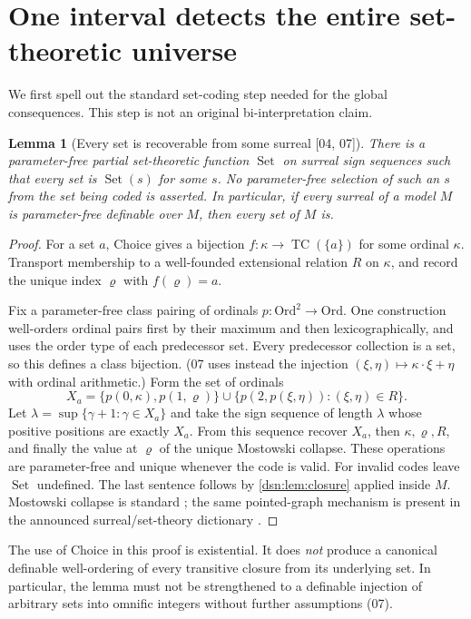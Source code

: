 \documentclass[11pt,a4paper]{article}
\numberwithin{equation}{section}
\newtheorem{lemma}[lemma]{Lemma}
\theoremstyle{definition}
\theoremstyle{remark}
\newcommand{\Ord}{\mathrm{Ord}}
\newcommand{\TC}{\operatorname{TC}}
\newcommand{\SetDec}{\operatorname{Set}}
\newcommand{\src}[1]{\textup{\textsf{\small[#1]}}}
\begin{document}
\section{One interval detects the entire set-theoretic universe}
\label{dsn:sec:global}

We first spell out the standard set-coding step needed for the global
consequences. This step is not an original bi-interpretation claim.

\begin{lemma}[Every set is recoverable from some surreal \src{04, 07}]
\label{dsn:lem:setcoding}
There is a parameter-free partial set-theoretic function $\SetDec$ on
surreal sign sequences such that every set is $\SetDec(s)$ for some $s$.
No parameter-free selection of such an $s$ from the set being coded is
asserted. In particular, if every surreal of a model $M$ is parameter-free
definable over $M$, then every set of $M$ is.
\end{lemma}
\begin{proof}
For a set $a$, Choice gives a bijection $f:\kappa\to\TC(\{a\})$
for some ordinal $\kappa$. Transport membership to a well-founded
extensional relation $R$ on $\kappa$, and record the unique index
$\varrho$ with $f(\varrho)=a$.

Fix a parameter-free class pairing of ordinals $p:\Ord^2\to\Ord$. One
construction well-orders ordinal pairs first by their maximum and then
lexicographically, and uses the order type of each predecessor set. Every
predecessor collection is a set, so this defines a class bijection. (07
uses instead the injection $(\xi,\eta)\mapsto\kappa\cdot\xi+\eta$ with
ordinal arithmetic.) Form the set of ordinals
\[
 X_a=\{p(0,\kappa),p(1,\varrho)\}
       \cup\{p(2,p(\xi,\eta)):(\xi,\eta)\in R\}.
\]
Let $\lambda=\sup\{\gamma+1:\gamma\in X_a\}$ and take the sign
sequence of length $\lambda$ whose positive positions are exactly
$X_a$. From this sequence recover $X_a$, then $\kappa,\varrho,R$, and
finally the value at $\varrho$ of the unique Mostowski collapse. These
operations are parameter-free and unique whenever the code is valid. For
invalid codes leave $\SetDec$ undefined. The last sentence follows by
\cref{dsn:lem:closure} applied inside $M$. Mostowski collapse is standard
\cite{Jech}; the same pointed-graph mechanism is present in the announced
surreal/set-theory dictionary \cite{CHY}.
\end{proof}

The use of Choice in this proof is existential. It does \emph{not} produce
a canonical definable well-ordering of every transitive closure from its
underlying set. In particular, the lemma must not be strengthened to a
definable injection of arbitrary sets into omnific integers without further
assumptions (07).
\end{document}
